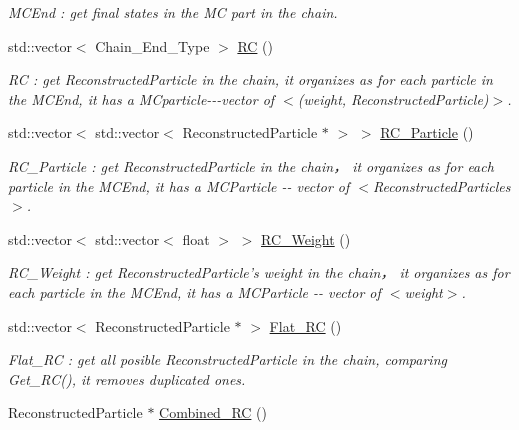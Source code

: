 \begin{DoxyCompactItemize}
\begin{DoxyCompactList}\small\item\em MCEnd : get final states in the MC part in the chain. \item\end{DoxyCompactList}\item 
std::vector$<$ Chain\_\-End\_\-Type $>$ \hyperlink{classToolSet_1_1CChain__Single_a3783b04dfa98bee280070fa443afa878}{RC} ()
\begin{DoxyCompactList}\small\item\em RC : get ReconstructedParticle in the chain, it organizes as for each particle in the MCEnd, it has a MCparticle-\/-\/-\/vector of $<$(weight, ReconstructedParticle)$>$. \item\end{DoxyCompactList}\item 
std::vector$<$ std::vector$<$ ReconstructedParticle $\ast$ $>$ $>$ \hyperlink{classToolSet_1_1CChain__Single_af928f52ff7640aeef93083b9fbe98b65}{RC\_\-Particle} ()
\begin{DoxyCompactList}\small\item\em RC\_\-Particle : get ReconstructedParticle in the chain， it organizes as for each particle in the MCEnd, it has a MCParticle -\/-\/ vector of $<$ReconstructedParticles$>$. \item\end{DoxyCompactList}\item 
std::vector$<$ std::vector$<$ float $>$ $>$ \hyperlink{classToolSet_1_1CChain__Single_ae1e9f5156d4f65888c0262284518601c}{RC\_\-Weight} ()
\begin{DoxyCompactList}\small\item\em RC\_\-Weight : get ReconstructedParticle's weight in the chain， it organizes as for each particle in the MCEnd, it has a MCParticle -\/-\/ vector of $<$weight$>$. \item\end{DoxyCompactList}\item 
std::vector$<$ ReconstructedParticle $\ast$ $>$ \hyperlink{classToolSet_1_1CChain__Single_aeead66cb0db211712f4bb5422b706209}{Flat\_\-RC} ()
\begin{DoxyCompactList}\small\item\em Flat\_\-RC : get all posible ReconstructedParticle in the chain, comparing Get\_\-RC(), it removes duplicated ones. \item\end{DoxyCompactList}\item 
ReconstructedParticle $\ast$ \hyperlink{classToolSet_1_1CChain__Single_acb6bc9bfa361f12472fc6ccfe899ede0}{Combined\_\-RC} ()

\end{DoxyCompactItemize}
